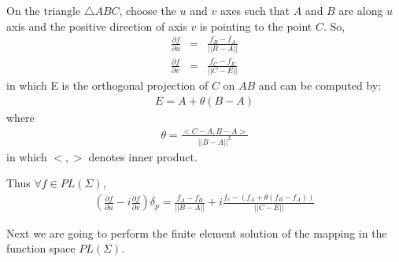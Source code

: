 \documentclass{InsightArticle}
\begin{document}
  On the triangle $\triangle ABC$, choose the $u$ and $v$ axes such
  that $A$ and $B$ are along $u$ axis and the positive direction of
  axis $v$ is pointing to the point $C$. So,
  \begin{eqnarray}    
    \frac{\partial f}{\partial u} &=& \frac{f_B - f_A}{||B - A||} \nonumber \\
    \frac{\partial f}{\partial v} &=& \frac{f_C - f_E}{||C - E||} \nonumber
  \end{eqnarray}  
  in which E is the orthogonal projection of $C$ on $AB$ and can be
  computed by:
  \begin{eqnarray}  
    E = A + \theta(B-A) \nonumber
  \end{eqnarray}  
  where
  \begin{eqnarray}  
    \theta = \frac{<C-A, B-A>}{||B-A||^2} \nonumber
  \end{eqnarray}  
  in which $<,>$ denotes inner product.
  
  Thus $\forall f \in PL(\Sigma)$, 
  \begin{eqnarray}  
    (\frac{\partial f}{\partial u} - i\frac{\partial f}{\partial v})\delta_p = 
    \frac{f_A - f_B}{|| B - A ||} + i\frac{f_c-(f_A + \theta(f_B - f_A))}{||C - E||} \label{Rinteqn}
  \end{eqnarray}  
  
  Next we are going to perform the finite element solution of the
  mapping in the function space $PL(\Sigma)$.
  
\end{document}
